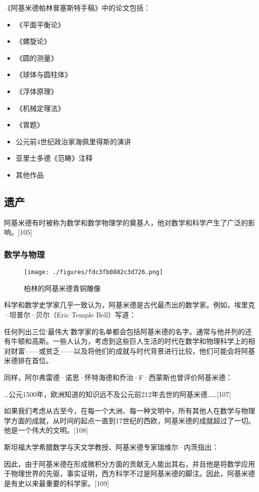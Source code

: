《阿基米德帕林普塞斯特手稿》中的论文包括：
\begin{itemize}
\item 《平面平衡论》
\item 《螺旋论》
\item 《圆的测量》
\item 《球体与圆柱体》
\item 《浮体原理》
\item 《机械定理法》
\item 《胃题》
\item 公元前4世纪政治家海佩里得斯的演讲
\item 亚里士多德《范畴》注释
\item 其他作品
\end{itemize}
\subsection{遗产}  
阿基米德有时被称为数学和数学物理学的奠基人，他对数学和科学产生了广泛的影响。[105]
\subsubsection{数学与物理}
\begin{figure}[ht]
\centering
\texttt{[image: ./figures/fdc3fb0882c3d726.png]}
\caption{柏林的阿基米德青铜雕像} \label{fig_Archim_11}
\end{figure}
科学和数学史学家几乎一致认为，阿基米德是古代最杰出的数学家。例如，埃里克·坦普尔·贝尔（Eric Temple Bell）写道：

任何列出三位‘最伟大’数学家的名单都会包括阿基米德的名字。通常与他并列的还有牛顿和高斯。一些人认为，考虑到这些巨人生活的时代在数学和物理科学上的相对财富——或贫乏——以及将他们的成就与时代背景进行比较，他们可能会将阿基米德排在首位。

同样，阿尔弗雷德·诺思·怀特海德和乔治·F·西蒙斯也曾评价阿基米德：

…公元1500年，欧洲知道的知识远不及公元前212年去世的阿基米德……[107]

如果我们考虑从古至今，在每一个大洲、每一种文明中，所有其他人在数学与物理学方面的成就，从时间的起点一直到17世纪的西欧，阿基米德的成就超过了一切。他是一个伟大的文明。[108]

斯坦福大学希腊数学与天文学教授、阿基米德专家瑞维尔·内茨指出：

因此，由于阿基米德在形成微积分方面的贡献无人能出其右，并且他是将数学应用于物理世界的先驱，事实证明，西方科学不过是阿基米德的脚注。因此，阿基米德是有史以来最重要的科学家。[109]


